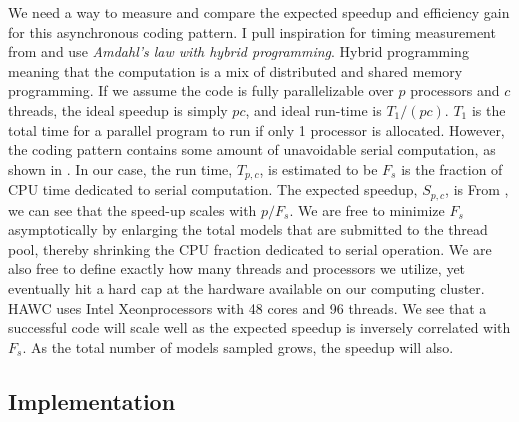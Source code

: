 We need a way to measure and compare the expected speedup and efficiency gain for this asynchronous coding pattern.
I pull inspiration for timing measurement from \cite{ArtofHPC} and use \textit{Amdahl's law with hybrid programming}.
Hybrid programming meaning that the computation is a mix of distributed and shared memory programming.
If we assume the code is fully parallelizable over $p$ processors and $c$ threads, the ideal speedup is simply $pc$, and ideal run-time is $T_1/(pc)$.
$T_1$ is the total time for a parallel program to run if only 1 processor is allocated.
However, the coding pattern contains some amount of unavoidable serial computation, as shown in .
In our case, the run time, $T_{p,c}$, is estimated to be
\amdahl
$F_s$ is the fraction of CPU time dedicated to serial computation.
The expected speedup, $S_{p,c}$, is
\amdahlSpeed
From , we can see that the speed-up scales with $p/F_s$.
We are free to minimize $F_s$ asymptotically by enlarging the total models that are submitted to the thread pool, thereby shrinking the CPU fraction dedicated to serial operation.
We are also free to define exactly how many threads and processors we utilize, yet eventually hit a hard cap at the hardware available on our computing cluster.
HAWC uses Intel Xeon\texttrademark processors with 48 cores and 96 threads.
We see that a successful code will scale well as the expected speedup is inversely correlated with $F_s$.
As the total number of models sampled grows, the speedup will also.

\subsection{Implementation}\label{sec:mtd_implementation}


